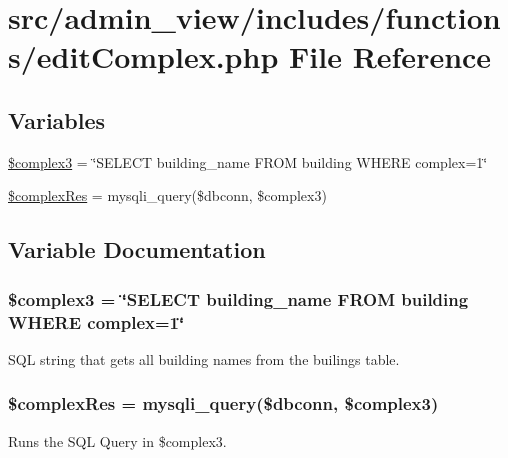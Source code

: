 \hypertarget{editComplex_8php}{\section{src/admin\-\_\-view/includes/functions/edit\-Complex.php \-File \-Reference}
\label{editComplex_8php}
}
\subsection*{\-Variables}
\begin{DoxyCompactItemize}
\item 
\hyperlink{editComplex_8php_a6f8a1bc2bbda3a3b8f381cc7b0b5f2fb}{\$complex3} = \char`\"{}\-S\-E\-L\-E\-C\-T building\-\_\-name \-F\-R\-O\-M building \-W\-H\-E\-R\-E complex=1\char`\"{}
\item 
\hyperlink{editComplex_8php_a8e5989179b69fda571d827939d1933d4}{\$complex\-Res} = mysqli\-\_\-query(\$dbconn, \$complex3)
\end{DoxyCompactItemize}


\subsection{\-Variable \-Documentation}
\hypertarget{editComplex_8php_a6f8a1bc2bbda3a3b8f381cc7b0b5f2fb}{
\subsubsection[{\$complex3}]{\setlength{\rightskip}{0pt plus 5cm}\$complex3 = \char`\"{}\-S\-E\-L\-E\-C\-T building\-\_\-name \-F\-R\-O\-M building \-W\-H\-E\-R\-E complex=1\char`\"{}}}\label{editComplex_8php_a6f8a1bc2bbda3a3b8f381cc7b0b5f2fb}
\-S\-Q\-L string that gets all building names from the builings table. \hypertarget{editComplex_8php_a8e5989179b69fda571d827939d1933d4}{
\subsubsection[{\$complex\-Res}]{\setlength{\rightskip}{0pt plus 5cm}\$complex\-Res = mysqli\-\_\-query(\$dbconn, \$complex3)}}\label{editComplex_8php_a8e5989179b69fda571d827939d1933d4}
\-Runs the \-S\-Q\-L \-Query in \$complex3. 